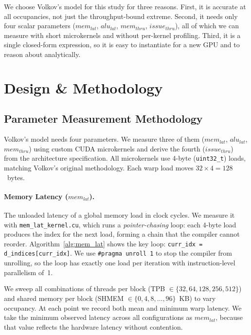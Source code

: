 We choose Volkov's model for this study for three reasons.
First, it is accurate at all occupancies, not just the throughput-bound extreme.
Second, it needs only four scalar parameters ($mem_{lat}$, $alu_{lat}$,
$mem_{thru}$, $issue_{thru}$), all of which we can measure with short
microkernels and without per-kernel profiling.
Third, it is a single closed-form expression, so it is easy to instantiate for
a new GPU and to reason about analytically.



\section{Design \& Methodology}
\label{sec:design}


\subsection{Parameter Measurement Methodology}
\label{subsec:param_measurement}

Volkov's model needs four parameters.
We measure three of them ($mem_{lat}$, $alu_{lat}$, $mem_{thru}$) using custom
CUDA microkernels and derive the fourth ($issue_{thru}$) from the
architecture specification.
All microkernels use 4-byte (\texttt{uint32\_t}) loads, matching Volkov's
original methodology.
Each warp load moves $32 \times 4 = 128$~bytes.


\paragraph{Memory Latency ($mem_{lat}$).}
The unloaded latency of a global memory load in clock cycles.
We measure it with \texttt{mem\_lat\_kernel.cu}, which runs a
\emph{pointer-chasing} loop: each 4-byte load produces the index for the
next load, forming a chain that the compiler cannot reorder.
Algorithm~\ref{alg:mem_lat} shows the key loop:
\texttt{curr\_idx = d\_indices[curr\_idx]}.
We use \texttt{\#pragma unroll 1} to stop the compiler from unrolling, so the
loop has exactly one load per iteration with instruction-level parallelism of~1.

We sweep all combinations of threads per block
(TPB $\in \{32, 64, 128, 256, 512\}$) and shared memory per block
(SHMEM $\in \{0, 4, 8, \ldots, 96\}$~KB) to vary occupancy.
At each point we record both mean and minimum warp latency.
We take the minimum observed latency across all configurations as $mem_{lat}$,
because that value reflects the hardware latency without contention.

